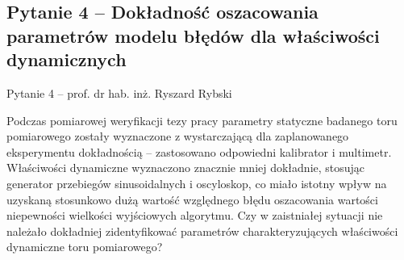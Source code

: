 \documentclass[12pt, polish, aspectratio = 169]{slides}
\begin{document}
\subsection{Pytanie 4 -- Dokładność oszacowania parametrów modelu błędów dla właściwości dynamicznych}

\begin{frame}{Pytanie 4 -- prof. dr hab. inż. Ryszard Rybski}\large
\begin{justify}
Podczas pomiarowej weryfikacji tezy pracy parametry statyczne badanego toru pomiarowego zostały wyznaczone z wystarczającą dla zaplanowanego eksperymentu dokładnością -- zastosowano odpowiedni kalibrator i multimetr. Właściwości dynamiczne wyznaczono znacznie mniej dokładnie, stosując generator przebiegów sinusoidalnych i oscyloskop, co miało istotny wpływ na uzyskaną stosunkowo dużą wartość względnego błędu oszacowania wartości niepewności wielkości wyjściowych algorytmu. Czy w zaistniałej sytuacji nie należało dokładniej zidentyfikować parametrów charakteryzujących właściwości dynamiczne toru pomiarowego?
\end{justify}
\end{frame}
\end{document}
